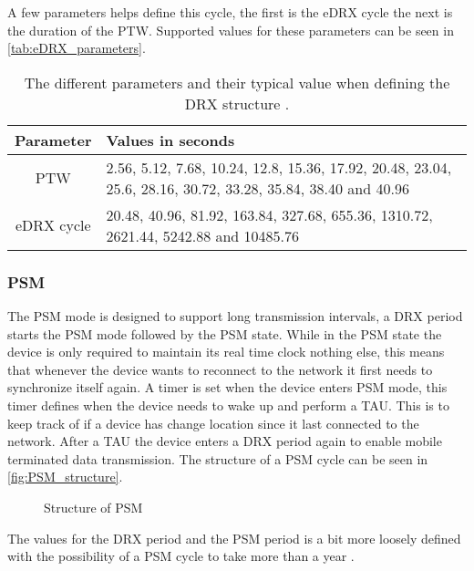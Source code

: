 A few parameters helps define this cycle, the first is the eDRX cycle the next is the duration of the \gls{PTW}. Supported values for these parameters can be seen in \autoref{tab:eDRX_parameters}.

\begin{table}[H]
\centering
\begin{tabular}{|c|p{8cm}|} \hline
\textbf{Parameter} & \textbf{Values in seconds} \\ \hline 
PTW & 2.56, 5.12, 7.68, 10.24, 12.8, 15.36, 17.92, 20.48, 23.04, 25.6, 28.16, 30.72, 33.28, 35.84, 38.40 and 40.96\\ \hline
eDRX cycle & 20.48, 40.96, 81.92, 163.84, 327.68, 655.36, 1310.72, 2621.44, 5242.88 and 10485.76 \\ \hline
\end{tabular}
\caption{The different parameters and their typical value when defining the DRX structure \citep{book_LTE_for_UMTS}.}
\label{tab:eDRX_parameters}
\end{table}

\subsubsection{PSM}
The PSM mode is designed to support long transmission intervals, a DRX period starts the PSM mode followed by the PSM state. While in the PSM state the device is only required to maintain its real time clock nothing else, this means that whenever the device wants to reconnect to the network it first needs to synchronize itself again. A timer is set when the device enters PSM mode, this timer defines when the device needs to wake up and perform a \gls{TAU}. This is to keep track of if a device has change location since it last connected to the network. After a TAU the device enters a DRX period again to enable mobile terminated data transmission. The structure of a PSM cycle can be seen in \autoref{fig:PSM_structure}.

\begin{figure}[H]
\centering
%
\caption{Structure of \gls{PSM}}
\label{fig:PSM_structure}
\end{figure}

The values for the DRX period and the PSM period is a bit more loosely defined with the possibility of a PSM cycle to take more than a year \citep{NB-IoT_Book}.




